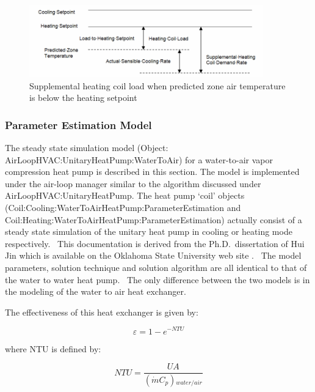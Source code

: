 \begin{figure}[hbtp] %
\centering
\includegraphics[width=0.9\textwidth, height=0.9\textheight, keepaspectratio=true]{media/image5263.png}
\caption{Supplemental heating coil load when predicted zone air temperature is below the heating setpoint \protect \label{fig:supplemental-heating-coil-load-when-predicted-005}}
\end{figure}

\subsubsection{Parameter Estimation Model}\label{parameter-estimation-model}

The steady state simulation model (Object: AirLoopHVAC:UnitaryHeatPump:WaterToAir) for a water-to-air vapor compression heat pump is described in this section. The model is implemented under the air-loop manager similar to the algorithm discussed under AirLoopHVAC:UnitaryHeatPump. The heat pump `coil' objects \\
(Coil:Cooling:WaterToAirHeatPump:ParameterEstimation and Coil:Heating:WaterToAirHeatPump:ParameterEstimation) actually consist of a steady state simulation of the unitary heat pump in cooling or heating mode respectively.~ This documentation is derived from the Ph.D.~dissertation of Hui Jin which is available on the Oklahoma State University web site . ~The model parameters, solution technique and solution algorithm are all identical to that of the water to water heat pump.~ The only difference between the two models is in the modeling of the water to air heat exchanger.

The effectiveness of this heat exchanger is given by:

\begin{equation}
\varepsilon  = 1 - {e^{ - NTU}}
\end{equation}

where NTU is defined by:

\begin{equation}
NTU = \frac{{UA}}{{(\dot mC{}_p){}_{water/air}}}
\end{equation}

